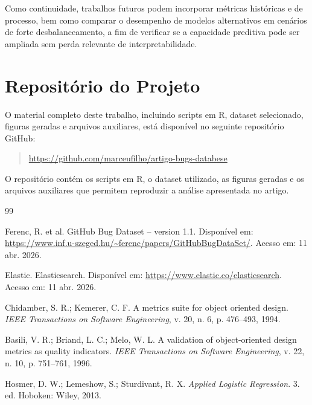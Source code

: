 \documentclass[12pt]{article}
\begin{document}
Como continuidade, trabalhos futuros podem incorporar métricas históricas e de processo, bem como comparar o desempenho de modelos alternativos em cenários de forte desbalanceamento, a fim de verificar se a capacidade preditiva pode ser ampliada sem perda relevante de interpretabilidade.

\newpage
\section{Repositório do Projeto}

O material completo deste trabalho, incluindo scripts em R, dataset selecionado, figuras geradas e arquivos auxiliares, está disponível no seguinte repositório GitHub:

\begin{quote}
\url{https://github.com/marceufilho/artigo-bugs-databese}
\end{quote}

\noindent
O repositório contém os scripts em R, o dataset utilizado, as figuras geradas e os arquivos auxiliares que permitem reproduzir a análise apresentada no artigo.

\begin{thebibliography}{99}

Ferenc, R. et al. GitHub Bug Dataset -- version 1.1. Disponível em:
\url{https://www.inf.u-szeged.hu/~ferenc/papers/GitHubBugDataSet/}. Acesso em: 11 abr. 2026.

Elastic. Elasticsearch. Disponível em:
\url{https://www.elastic.co/elasticsearch}. Acesso em: 11 abr. 2026.

Chidamber, S. R.; Kemerer, C. F. A metrics suite for object oriented design.
\textit{IEEE Transactions on Software Engineering}, v. 20, n. 6, p. 476--493, 1994.

Basili, V. R.; Briand, L. C.; Melo, W. L. A validation of object-oriented design metrics as quality indicators.
\textit{IEEE Transactions on Software Engineering}, v. 22, n. 10, p. 751--761, 1996.

Hosmer, D. W.; Lemeshow, S.; Sturdivant, R. X.
\textit{Applied Logistic Regression}. 3. ed. Hoboken: Wiley, 2013.

\end{thebibliography}

\newpage
\appendix
\end{document}
